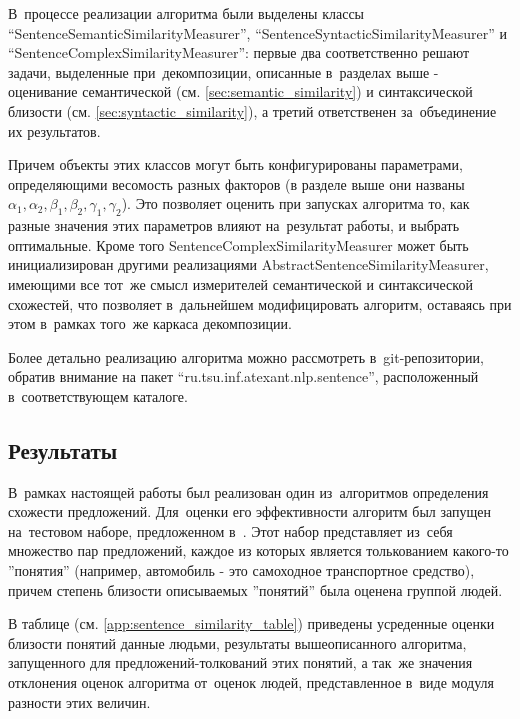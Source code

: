 В~процессе реализации алгоритма были выделены классы ``SentenceSemanticSimilarityMeasurer'',
``SentenceSyntacticSimilarityMeasurer'' и ``SentenceComplexSimilarityMeasurer'':
первые два соответственно решают задачи, выделенные при~декомпозиции, описанные
в~разделах выше - оценивание семантической (см. \ref{sec:semantic_similarity}) 
и синтаксической близости (см. \ref{sec:syntactic_similarity}),
а третий ответственен за~объединение их результатов. 

Причем объекты этих классов
могут быть конфигурированы параметрами, определяющими весомость разных факторов
(в разделе выше они названы $\alpha_1,\alpha_2,\beta_1, \beta_2, \gamma_1, \gamma_2$).
Это позволяет оценить при запусках алгоритма то, как разные значения этих параметров влияют на~результат работы,
и выбрать оптимальные. Кроме того SentenceComplexSimilarityMeasurer может быть инициализирован 
другими реализациями AbstractSentenceSimilarityMeasurer, имеющими все тот~же смысл
измерителей семантической и синтаксической схожестей, что позволяет в~дальнейшем модифицировать алгоритм,
оставаясь при этом в~рамках того~же каркаса декомпозиции. 

Более детально реализацию алгоритма можно рассмотреть в~git-репозитории\cite{github},
обратив внимание на пакет ``ru.tsu.inf.atexant.nlp.sentence'',
расположенный в~соответствующем каталоге.

\subsection{Результаты}
В~рамках настоящей работы был реализован один из~алгоритмов определения схожести предложений.
Для~оценки его эффективности алгоритм был запущен на~тестовом наборе,
предложенном в~\cite{complexSim}. Этот набор представляет из~себя множество пар предложений,
каждое из которых является толькованием какого-то ''понятия'' (например, автомобиль - это самоходное транспортное средство),
причем степень близости описываемых ''понятий'' была оценена группой людей.

В таблице (см. \ref{app:sentence_similarity_table}) приведены усреденные оценки близости понятий данные людьми,
результаты вышеописанного алгоритма, запущенного для предложений-толкований этих понятий, 
а так~же значения отклонения оценок алгоритма от~оценок людей, 
представленное в~виде модуля разности этих величин.

